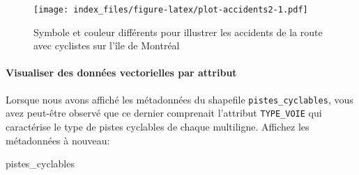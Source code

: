 \documentclass[]{article}
\newenvironment{Shaded}{\begin{snugshade}}{\end{snugshade}}
\newcommand{\NormalTok}[1]{#1}
\let\oldparagraph\paragraph
\renewcommand{\paragraph}[1]{\oldparagraph{#1}\mbox{}}
\begin{document}
\begin{figure}
\centering
\texttt{[image: index\_files/figure-latex/plot-accidents2-1.pdf]}
\caption{Symbole et couleur différents pour illustrer les accidents de
la route avec cyclistes sur l'île de Montréal}
\end{figure}

\paragraph{Visualiser des données vectorielles par
attribut}\label{visualiser-des-donnuxe9es-vectorielles-par-attribut}

Lorsque nous avons affiché les métadonnées du shapefile
\texttt{pistes\_cyclables}, vous avez peut-être observé que ce dernier
comprenait l'attribut \texttt{TYPE\_VOIE} qui caractérise le type de
pistes cyclables de chaque multiligne. Affichez les métadonnées à
nouveau:

\begin{Shaded}
\begin{Highlighting}[]
\NormalTok{pistes_cyclables}
\end{Highlighting}
\end{Shaded}
\end{document}
